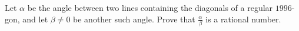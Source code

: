 Let $\alpha$ be the angle between two lines containing the diagonals of a regular $1996$-gon, and let $\beta\not= 0$ be another such angle. Prove that $\frac{\alpha}{\beta}$ is a rational number.